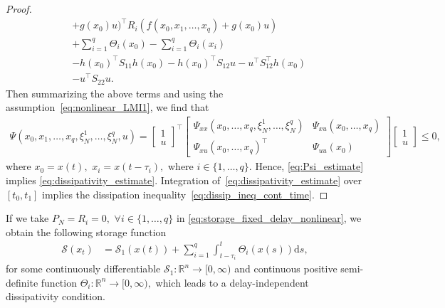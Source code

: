 \documentclass[12pt]{article}
\begin{document}
\begin{proof}
\begin{align*}
&+g(x_0)u)^\top R_i (f(x_0,x_1,\ldots,x_q)+g(x_0)u)\\ &+\sum_{i=1}^q \Theta_i(x_0)- \sum_{i=1}^q\Theta_i(x_i) \\ 
&-h(x_0)^\top S_{11}h(x_0)-h(x_0)^\top S_{12}u-u^\top S_{12}^\top h(x_0)\\
&-u^\top S_{22}u.
\end{align*}
Then summarizing the above terms and using the assumption~\eqref{eq:nonlinear_LMI1}, we find that 
\footnotesize\begin{align}
\Psi(x_0,x_1,\ldots,x_q,\xi^1_N,\ldots,\xi^q_N,u)=\begin{bmatrix}
    1\\ u
\end{bmatrix}^\top\left[ \begin{smallmatrix}
    \Psi_{xx}(x_0,\ldots,x_q,\xi^1_N,\ldots,\xi^q_N) & \Psi_{xu}(x_0,\ldots,x_q)\\ \Psi_{xu}(x_0,\ldots,x_q)^\top & \Psi_{uu}(x_0)
\end{smallmatrix}\right]\begin{bmatrix}
    1\\ u
\end{bmatrix}\leq 0, \label{eq:Psi_estimate}
\end{align}
where $x_0=x(t),$ $x_i=x(t-\tau_i),$ where $i \in \{1,\ldots,q\}.$ 
Hence, \eqref{eq:Psi_estimate} implies \eqref{eq:dissipativity_estimate}. Integration of~\eqref{eq:dissipativity_estimate} over $[t_0,t_1]$ implies the dissipation inequality~\eqref{eq:dissip_ineq_cont_time}.
\end{proof}
If we take $P_N=R_i=0,$ $\forall i  \in \{1,\ldots,q\}$ in \eqref{eq:storage_fixed_delay_nonlinear}, we obtain the following storage function 
\begin{equation}\label{eq:storage_function_different_delays}
\begin{split}
\mathcal{S}(x_t) &= \mathcal{S}_1(x(t))+\sum_{i=1}^q 
\int_{t-\tau_i}^{t}  \Theta_i( x(s)) \mathrm{d}s,
\end{split}
\end{equation}
for some continuously differentiable $\mathcal{S}_1:\mathbb{R}^n\rightarrow[0,\infty)$ and continuous positive semi-definite function 
$\Theta_i:\mathbb{R}^n\rightarrow[0,\infty),$ which leads to a delay-independent dissipativity condition. 
\end{document}
